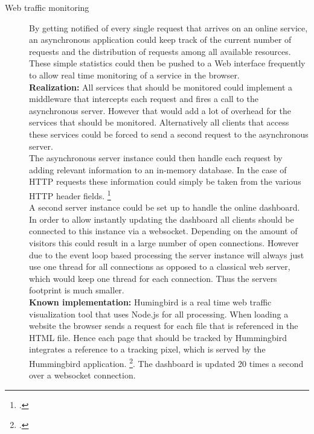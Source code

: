\begin{description}
  \item[Web traffic monitoring] By getting notified of every single request that
  arrives on an online service, an asynchronous application could keep track of the
  current number of requests and the distribution of requests among all
  available resources. These simple statistics could then be pushed to a Web interface
  frequently to allow real time monitoring of a service in the browser.\\
  \textbf{Realization:} All services that should be monitored could implement a
  middleware that intercepts each request and fires a call to the asynchronous
  server. However that would add a lot of overhead for the services that should
  be monitored. Alternatively all clients that access these services could be forced to send a
  second request to the asynchronous server.\\
  The asynchronous server instance could then handle each request by adding
  relevant information to an in-memory database. In the case of HTTP requests
  these information could simply be taken from the various HTTP header fields.
  \footcite[Cf.][]{http_rfc}\\
  A second server instance could
  be set up to handle the online dashboard.
  In order to allow instantly updating the dashboard all clients should be
  connected to this instance via a websocket. Depending on the amount of visitors
  this could result in a large number of open connections. However due to the
  event loop based processing the server instance will always just use one
  thread for all connections as opposed to a classical web server, which would
  keep one thread for each connection. Thus the servers footprint is much
  smaller.\\
  \textbf{Known implementation:} Humingbird is a real time web traffic
  visualization tool that uses Node.js for all processing. When loading a
  website the browser sends a request for each file that is referenced in the
  HTML file. Hence each page that should be tracked by Hummingbird integrates a
  reference to a tracking pixel, which is served by the Hummingbird application.
  \footcite[Cf.][]{hummingbird}. The dashboard is updated 20 times a second
  over a websocket connection.
  
  
  

\end{description}
